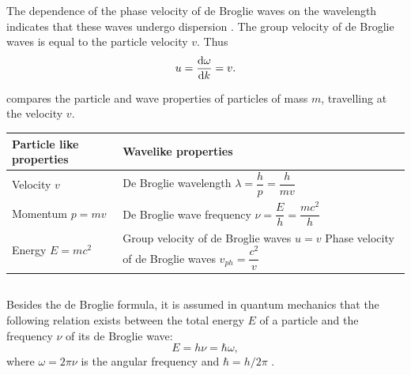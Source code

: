 The dependence of the phase velocity of de Broglie waves on the wavelength indicates that these waves undergo dispersion . The group velocity  of de Broglie waves is equal to the particle velocity $v$. Thus
\begin{equation*}%
u = \dv{\omega}{k} = v.
\end{equation*}

 compares the particle and wave properties of particles of mass $m$, travelling at the velocity $v$.

\begin{table}
\begin{small}
\begin{center}
\begin{tabular}{p{2cm}p{5cm}}
\toprule
\textbf{Particle like properties} & \textbf{Wavelike properties} \\
\midrule
Velocity $v$ & De Broglie wavelength \newline $\lambda = \dfrac{h}{p} = \dfrac{h}{mv} $\\
Momentum $p = mv$ &  De Broglie wave frequency \newline  $\nu = \dfrac{E}{h} = \dfrac{mc^{2}}{h} $ \\
Energy $E = mc^{2}$ & Group velocity of de Broglie waves \newline  $u = v$ \newline
Phase velocity of de Broglie waves \newline  $v_{ph} = \dfrac{c^{2}}{v}$\\
\bottomrule
\end{tabular}
\end{center}
\end{small}
\end{table}


\subsection{}\label{38.1.8} Besides the de Broglie formula, it is assumed in quantum mechanics that the following relation exists between the total energy $E$ of a particle and the frequency $\nu$ of its de Broglie wave:
\begin{equation*}%
E = h \nu = \hbar \omega,
\end{equation*}
where $\omega = 2\pi \nu$ is the angular frequency  and $\hbar = h/2\pi$ .

